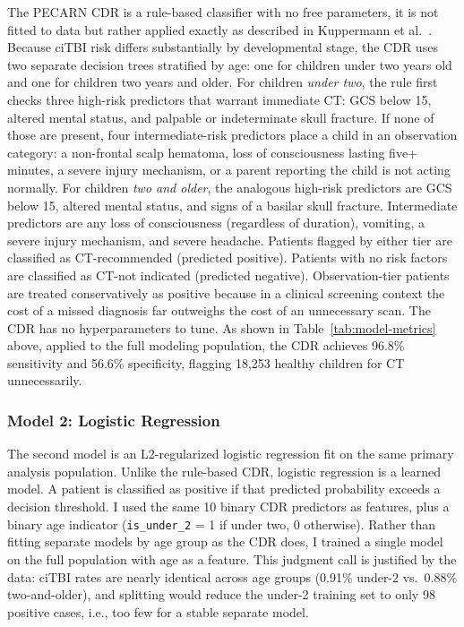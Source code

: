 \documentclass[11pt,letterpaper]{article}
\begin{document}
The PECARN CDR is a rule-based classifier with no free parameters, it is not fitted to data but rather applied exactly as described in Kuppermann et al.~\cite{kuppermann2009}. Because ciTBI risk differs substantially by developmental stage, the CDR uses two separate decision trees stratified by age: one for children under two years old and one for children two years and older. For children \textit{under two}, the rule first checks three high-risk predictors that warrant immediate CT: GCS below 15, altered mental status, and palpable or indeterminate skull fracture. If none of those are present, four intermediate-risk predictors place a child in an observation category: a non-frontal scalp hematoma, loss of consciousness lasting five+ minutes, a severe injury mechanism, or a parent reporting the child is not acting normally. For children \textit{two and older}, the analogous high-risk predictors are GCS below 15, altered mental status, and signs of a basilar skull fracture. Intermediate predictors are any loss of consciousness (regardless of duration), vomiting, a severe injury mechanism, and severe headache. Patients flagged by either tier are classified as CT-recommended (predicted positive). Patients with no risk factors are classified as CT-not indicated (predicted negative). Observation-tier patients are treated conservatively as positive because in a clinical screening context the cost of a missed diagnosis far outweighs the cost of an unnecessary scan. The CDR has no hyperparameters to tune. As shown in Table~\ref{tab:model-metrics} above, applied to the full modeling population, the CDR achieves 96.8\% sensitivity and 56.6\% specificity, flagging 18,253 healthy children for CT unnecessarily.

\subsubsection*{Model 2: Logistic Regression}

The second model is an L2-regularized logistic regression fit on the same primary analysis population. Unlike the rule-based CDR, logistic regression is a learned model. A patient is classified as positive if that predicted probability exceeds a decision threshold. I used the same 10 binary CDR predictors as features, plus a binary age indicator (\texttt{is\_under\_2} = 1 if under two, 0 otherwise). Rather than fitting separate models by age group as the CDR does, I trained a single model on the full population with age as a feature. This judgment call is justified by the data: ciTBI rates are nearly identical across age groups (0.91\% under-2 vs.\ 0.88\% two-and-older), and splitting would reduce the under-2 training set to only 98 positive cases, i.e., too few for a stable separate model. 
\end{document}
